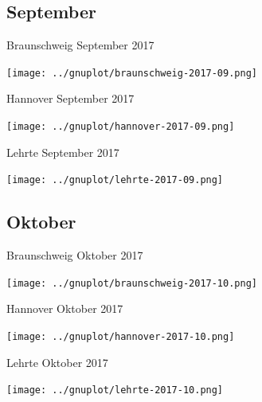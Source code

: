 \documentclass[aspectratio=169]{beamer} %
\begin{document}
\subsection{September}
\begin{frame}{Braunschweig September 2017}
  \begin{center}
    \texttt{[image: ../gnuplot/braunschweig-2017-09.png]}
  \end{center}
\end{frame}
\begin{frame}{Hannover \hspace{4cm} September 2017}
  \begin{center}
    \texttt{[image: ../gnuplot/hannover-2017-09.png]}
  \end{center}
\end{frame}
\begin{frame}{Lehrte \hspace{2cm} September 2017}
  \begin{center}
    \texttt{[image: ../gnuplot/lehrte-2017-09.png]}
  \end{center}
\end{frame}

\subsection{Oktober}
\begin{frame}{Braunschweig Oktober 2017}
  \begin{center}
    \texttt{[image: ../gnuplot/braunschweig-2017-10.png]}
  \end{center}
\end{frame}
\begin{frame}{Hannover \hspace{4cm} Oktober 2017}
  \begin{center}
    \texttt{[image: ../gnuplot/hannover-2017-10.png]}
  \end{center}
\end{frame}
\begin{frame}{Lehrte \hspace{2cm} Oktober 2017}
  \begin{center}
    \texttt{[image: ../gnuplot/lehrte-2017-10.png]}
  \end{center}
\end{frame}
\end{document}
